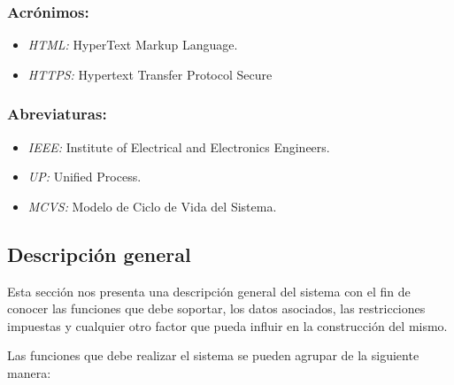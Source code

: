         \subsubsection{Acrónimos:}

        \begin{itemize}

        \item \emph{HTML:} HyperText Markup Language.
        
        \item \emph{HTTPS:} Hypertext Transfer Protocol Secure

        \end{itemize}
 
        \subsubsection{Abreviaturas:}

        \begin{itemize}

        \item \emph{IEEE:} Institute of Electrical and Electronics Engineers.
 
        \item \emph{UP:} Unified Process.

        \item \emph{MCVS:} Modelo de Ciclo de Vida del Sistema.

         \end{itemize}
    

 \subsection{Descripción general}

    Esta sección nos presenta una descripción general del sistema con el fin de conocer las funciones que debe soportar, los datos asociados, las restricciones impuestas y cualquier otro factor que pueda influir en la construcción del mismo.

Las funciones que debe realizar el sistema se pueden agrupar de la siguiente manera:

